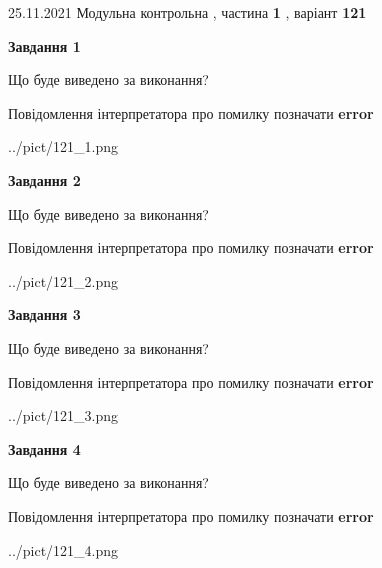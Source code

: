 \documentclass[10pt, ukrainian]{article}
\begin{document}
{25.11.2021 Модульна контрольна , частина \textbf { 1 }, варіант  \No \textbf { 121 }\par}
{
\begin {large}

{\begin {center}\textbf{Завдання 1}\end {center}}\par
Що буде виведено за виконання? \par
Повідомлення інтерпретатора про помилку позначати \textbf{error}

\begin{center}
	{../pict/121_1.png}
\end{center}
\newpage

{\begin {center}\textbf{Завдання 2}\end {center}}\par
Що буде виведено за виконання? \par
Повідомлення інтерпретатора про помилку позначати \textbf{error}

\begin{center}
	{../pict/121_2.png}
\end{center}
\newpage

{\begin {center}\textbf{Завдання 3}\end {center}}\par
Що буде виведено за виконання? \par
Повідомлення інтерпретатора про помилку позначати \textbf{error}

\begin{center}
	{../pict/121_3.png}
\end{center}
\newpage

{\begin {center}\textbf{Завдання 4}\end {center}}\par
Що буде виведено за виконання? \par
Повідомлення інтерпретатора про помилку позначати \textbf{error}

\begin{center}
	{../pict/121_4.png}
\end{center}
\newpage


\end{large}}
\end{document}
